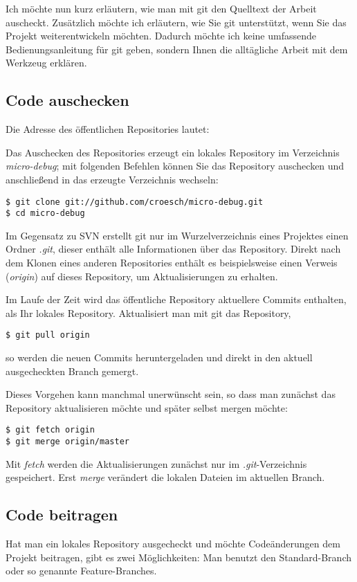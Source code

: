 Ich möchte nun kurz erläutern, wie man mit \gls{git} den Quelltext der Arbeit auscheckt. Zusätzlich möchte ich erläutern, wie Sie \gls{git} unterstützt, wenn Sie das Projekt weiterentwickeln möchten. Dadurch möchte ich keine umfassende Bedienungsanleitung für \gls{git} geben, sondern Ihnen die alltägliche Arbeit mit dem Werkzeug erklären.

\subsection{Code auschecken}
Die Adresse des öffentlichen Repositories %
lautet:

Das Auschecken des Repositories %
erzeugt ein lokales Repository im Verzeichnis \emph{micro-debug}; mit folgenden Befehlen können Sie das Repository auschecken und anschließend in das erzeugte Verzeichnis wechseln:
\begin{verbatim}
$ git clone git://github.com/croesch/micro-debug.git
$ cd micro-debug
\end{verbatim}

Im Gegensatz zu SVN %
erstellt \gls{git} nur im Wurzelverzeichnis eines Projektes einen Ordner \emph{.git}, dieser enthält alle Informationen über das Repository. Direkt nach dem Klonen eines anderen Repositories enthält es beispielsweise einen Verweis (\emph{origin}) auf dieses Repository, um Aktualisierungen zu erhalten.

Im Laufe der Zeit wird das öffentliche Repository aktuellere Commits enthalten, als Ihr lokales Repository. Aktualisiert man mit \gls{git} das Repository,
\begin{verbatim}
$ git pull origin
\end{verbatim}
so werden die neuen Commits heruntergeladen und direkt in den aktuell ausgecheckten Branch gemergt. %

Dieses Vorgehen kann manchmal unerwünscht sein, so dass man zunächst das Repository aktualisieren möchte und später selbst mergen möchte:
\begin{verbatim}
$ git fetch origin
$ git merge origin/master
\end{verbatim}
Mit \emph{fetch} werden die Aktualisierungen zunächst nur im \emph{.git}-Verzeichnis gespeichert. Erst \emph{merge} verändert die lokalen Dateien im aktuellen Branch.

\subsection{Code beitragen}
Hat man ein lokales Repository ausgecheckt und möchte Codeänderungen dem Projekt beitragen, gibt es zwei Möglichkeiten: Man benutzt den Standard-Branch oder so genannte Feature-Branches.


